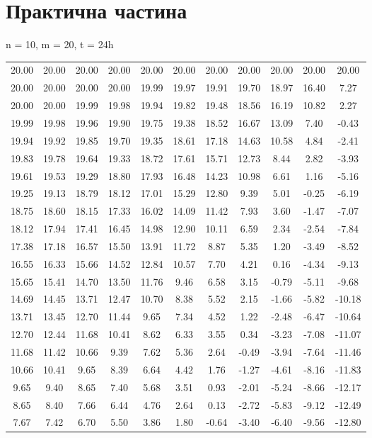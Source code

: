 \documentclass[fontsize=14pt,DIV=1,a4paper]{scrartcl}
\begin{document}
	\newpage
	\section{Практична частина}

	\vspace{10px}
    n = 10, m = 20, t = 24h
    \vspace{10px}

    \begin{tabular}{c c c c c c c c c c c}
	  20.00&  20.00&  20.00&  20.00&  20.00&  20.00&  20.00&  20.00&  20.00&  20.00&  20.00 \\
	  20.00&  20.00&  20.00&  20.00&  19.99&  19.97&  19.91&  19.70&  18.97&  16.40&   7.27 \\
	  20.00&  20.00&  19.99&  19.98&  19.94&  19.82&  19.48&  18.56&  16.19&  10.82&   2.27 \\
	  19.99&  19.98&  19.96&  19.90&  19.75&  19.38&  18.52&  16.67&  13.09&   7.40&  -0.43 \\
	  19.94&  19.92&  19.85&  19.70&  19.35&  18.61&  17.18&  14.63&  10.58&   4.84&  -2.41 \\
	  19.83&  19.78&  19.64&  19.33&  18.72&  17.61&  15.71&  12.73&   8.44&   2.82&  -3.93 \\
	  19.61&  19.53&  19.29&  18.80&  17.93&  16.48&  14.23&  10.98&   6.61&   1.16&  -5.16 \\
	  19.25&  19.13&  18.79&  18.12&  17.01&  15.29&  12.80&   9.39&   5.01&  -0.25&  -6.19 \\
	  18.75&  18.60&  18.15&  17.33&  16.02&  14.09&  11.42&   7.93&   3.60&  -1.47&  -7.07 \\
	  18.12&  17.94&  17.41&  16.45&  14.98&  12.90&  10.11&   6.59&   2.34&  -2.54&  -7.84 \\
	  17.38&  17.18&  16.57&  15.50&  13.91&  11.72&   8.87&   5.35&   1.20&  -3.49&  -8.52 \\
	  16.55&  16.33&  15.66&  14.52&  12.84&  10.57&   7.70&   4.21&   0.16&  -4.34&  -9.13 \\
	  15.65&  15.41&  14.70&  13.50&  11.76&   9.46&   6.58&   3.15&  -0.79&  -5.11&  -9.68 \\
	  14.69&  14.45&  13.71&  12.47&  10.70&   8.38&   5.52&   2.15&  -1.66&  -5.82& -10.18 \\
	  13.71&  13.45&  12.70&  11.44&   9.65&   7.34&   4.52&   1.22&  -2.48&  -6.47& -10.64 \\
	  12.70&  12.44&  11.68&  10.41&   8.62&   6.33&   3.55&   0.34&  -3.23&  -7.08& -11.07 \\
	  11.68&  11.42&  10.66&   9.39&   7.62&   5.36&   2.64&  -0.49&  -3.94&  -7.64& -11.46 \\
	  10.66&  10.41&   9.65&   8.39&   6.64&   4.42&   1.76&  -1.27&  -4.61&  -8.16& -11.83 \\
	   9.65&   9.40&   8.65&   7.40&   5.68&   3.51&   0.93&  -2.01&  -5.24&  -8.66& -12.17 \\
	   8.65&   8.40&   7.66&   6.44&   4.76&   2.64&   0.13&  -2.72&  -5.83&  -9.12& -12.49 \\
	   7.67&   7.42&   6.70&   5.50&   3.86&   1.80&  -0.64&  -3.40&  -6.40&  -9.56& -12.80 \\
    \end{tabular}
	
\end{document}
